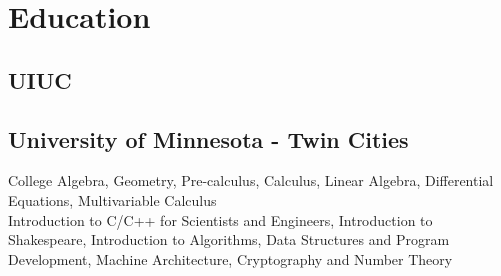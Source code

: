 \documentclass[]{deedy-resume-openfont}
\begin{document}
%
%
\lastupdated

%
%



%
%

\begin{minipage}[t]{0.33\textwidth} 


\section{Education} 

\subsection{UIUC}
\sectionsep

\subsection{University of Minnesota - Twin Cities}
College Algebra, Geometry, Pre-calculus, Calculus, Linear Algebra, Differential Equations, Multivariable Calculus \\
\sectionsep
{}
Introduction to C/C++ for Scientists and Engineers, Introduction to Shakespeare, Introduction to Algorithms, Data Structures and Program Development, Machine Architecture, Cryptography and Number Theory
\sectionsep


\end{minipage}
\end{document}
